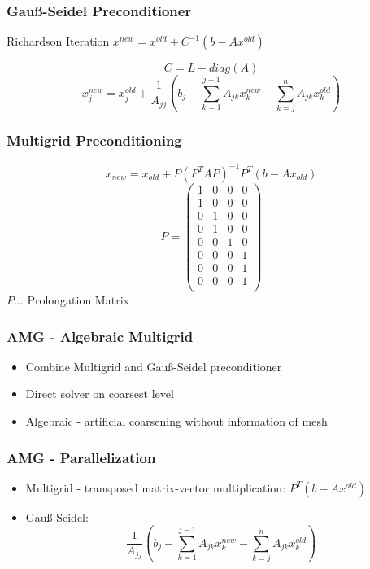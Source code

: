 \documentclass{beamer}
\begin{document}
\begin{frame}
\frametitle{Gau\ss-Seidel Preconditioner}
\begin{block}{Richardson Iteration}
$x^{new} = x^{old} + C^{-1} (b - Ax^{old})$
\end{block}
$$C = L + diag(A)$$
$$x_j^{new} = x_j^{old} + \frac{1}{A_{jj}} \left(b_{j} - \sum_{k=1}^{j-1} A_{jk}
x_k^{new} - \sum_{k=j}^{n} A_{jk} x_k^{old}\right)$$
\end{frame}

\begin{frame}
\frametitle{Multigrid Preconditioning}
$$x_{new} = x_{old} + P (P^{T} A P)^{-1} P^{T} (b - A x_{old})$$
$$P =
\begin{pmatrix}
  1 & 0 & 0 & 0 \\
  1 & 0 & 0 & 0 \\
  0 & 1 & 0 & 0 \\
  0 & 1 & 0 & 0 \\
  0 & 0 & 1 & 0 \\
  0 & 0 & 0 & 1 \\
  0 & 0 & 0 & 1 \\
  0 & 0 & 0 & 1 \\
\end{pmatrix}
$$
$P \dots$ Prolongation Matrix
\end{frame}

\begin{frame}
\frametitle{AMG - Algebraic Multigrid}
\begin{itemize}
  \item Combine Multigrid and Gau\ss-Seidel preconditioner
  \item Direct solver on coarsest level
  \item Algebraic - artificial coarsening without information of mesh
\end{itemize}
\end{frame}

\begin{frame}
\frametitle{AMG - Parallelization}
\begin{itemize}
  \item Multigrid - transposed matrix-vector multiplication:
    $P^{T} (b-Ax^{old})$
  \item Gau\ss-Seidel: \\ $$\frac{1}{A_{jj}} \left(b_{j} - \sum_{k=1}^{j-1} A_{jk}
x_k^{new} - \sum_{k=j}^{n} A_{jk} x_k^{old}\right)$$
\end{itemize}
\end{frame}
\end{document}
